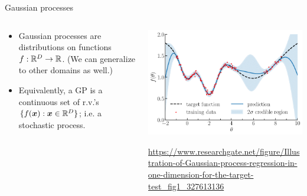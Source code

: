 \documentclass[aspectratio=169]{beamer}
\begin{document}
\begin{frame}{Gaussian processes}
\begin{columns}
\begin{column}{.5\textwidth}
\begin{itemize}
    \item Gaussian processes are distributions on functions~$f: \mathbb{R}^D \to \mathbb{R}$. (We can generalize to other domains as well.)
    \item Equivalently, a GP is a continuous set of r.v.'s $\{f(\boldsymbol{x}): \boldsymbol{x} \in \mathbb{R}^D\}$; i.e. a stochastic process.
\end{itemize}
\end{column}
\begin{column}{.45\textwidth}
\begin{center}
    \includegraphics[width=\textwidth]{figures/lap8/gp.png}
    
    \footnotesize{\url{https://www.researchgate.net/figure/Illustration-of-Gaussian-process-regression-in-one-dimension-for-the-target-test_fig1_327613136}}
\end{center}
\end{column}
\end{columns}
\end{frame}
\end{document}
